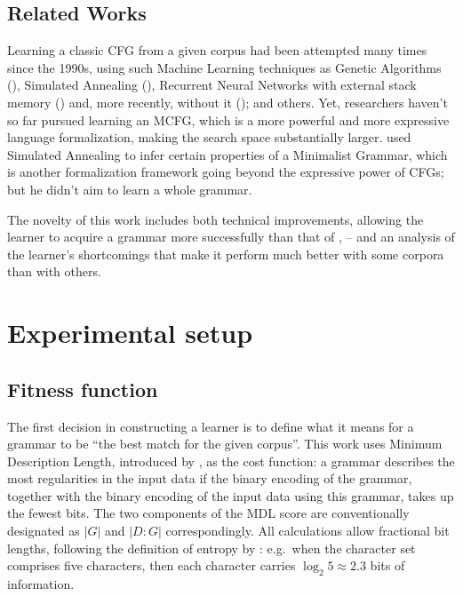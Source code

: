\documentclass{article}
\begin{document}
\subsection{Related Works}

Learning a classic CFG from a given corpus had been attempted many times since the 1990s,
using such Machine Learning techniques as Genetic Algorithms (\cite{lankhorst}),
Simulated Annealing (\cite{katzir, keinan}),\linebreak
Recurrent Neural Networks with external stack memory (\cite{das})
and, more recently, without it (\cite{cartling}); and others. Yet, researchers haven't so far pursued
learning an MCFG, which is a more powerful and more expressive language formalization,
making the search space substantially larger.
\cite{avraham} used Simulated Annealing to infer certain properties of a Minimalist Grammar,
which is another formalization
framework going beyond the expressive power of CFGs; but he didn't aim to learn a whole grammar.

The novelty of this work includes both technical improvements,
allowing the learner to acquire a grammar more successfully than that of \cite{keinan},
-- and an analysis of
the learner's shortcomings that make it perform much better with some corpora than with others.


\section{Experimental setup}
\subsection{Fitness function}

The first decision in constructing a learner is to define what it means for a grammar to be
``the best match for the given corpus''. This work uses Minimum Description Length, introduced by \cite{rissanen},
as the cost function: a grammar describes the most regularities in the input data
if the binary encoding of the grammar, together with the binary encoding
of the input data using this grammar, takes up the fewest bits.
The two components of the MDL score are conventionally designated as $|G|$ and $|D:G|$ correspondingly.
All calculations allow fractional bit lengths, following the definition of entropy  by \cite{shannon}:
e.g.\ when the character set comprises five characters, then each character carries
$\log_2 5\approx2.3$ bits of information.
\end{document}
